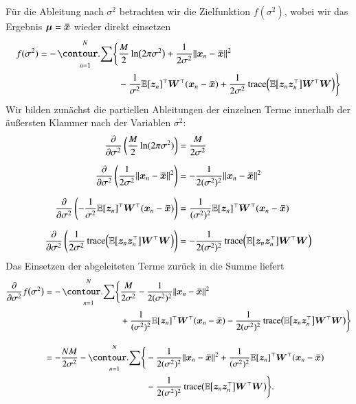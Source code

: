 Für die Ableitung nach $\sigma^2$ betrachten wir die Zielfunktion $f(\sigma^2)$, wobei wir das Ergebnis $\bm{\mu} = \bm{\bar{x}}$ wieder direkt einsetzen
\begin{equation*}
    	\begin{aligned}
        		f(\sigma^2) = -\sum_{n=1}^N \Biggl\{ 
            		&\frac{M}{2} \ln\bigl( 2 \pi \sigma^2 \bigr) + \frac{1}{2 \sigma^2} \Vert \bx_n - \bxmean \Vert^2
		\\
            		&- \frac{1}{\sigma^2} \E[\bz_n]^\top \bW^\top (\bx_n - \bxmean) + \frac{1}{2 \sigma^2} \trace\Bigl( \E\bigl[ \bz_n \bz_n^\top \bigr] 				\bW^\top \bW \Bigr) 
        		\Biggr\}
    \end{aligned}
\end{equation*}
Wir bilden zunächst die partiellen Ableitungen der einzelnen Terme innerhalb der äußersten Klammer nach der Variablen $\sigma^2$:
\begin{align*}
	\frac{\partial}{\partial \sigma^2} \left( \frac{M}{2} \ln(2 \pi \sigma^2) \right) 
        		&= \frac{M}{2 \sigma^2}
\\[2mm]
	\frac{\partial}{\partial \sigma^2} \left( \frac{1}{2 \sigma^2} \Vert \bm{x}_n - \bm{\bar{x}} \Vert^2 \right) 
        		&= -\frac{1}{2 (\sigma^2)^2} \Vert \bm{x}_n - \bm{\bar{x}} \Vert^2
\\[2mm]
	\frac{\partial}{\partial \sigma^2} \left( -\frac{1}{\sigma^2} \mathbb{E}[\bm{z}_n]^\top \bm{W}^\top (\bm{x}_n - \bm{\bar{x}}) \right) 
        		&= \frac{1}{(\sigma^2)^2} \mathbb{E}[\bm{z}_n]^\top \bm{W}^\top (\bm{x}_n - \bm{\bar{x}})
\\[2mm]
	\frac{\partial}{\partial \sigma^2} \left( \frac{1}{2 \sigma^2} \operatorname{\text{trace}}\Bigl( \mathbb{E}\bigl[ \bm{z}_n \bm{z}_n^\top \bigr] \bm{W}^\top \bm{W} \Bigr) \right) 
		&= -\frac{1}{2 (\sigma^2)^2} \operatorname{\text{trace}}\Bigl( \mathbb{E}\bigl[ \bm{z}_n \bm{z}_n^\top \bigr] \bm{W}^\top \bm{W} \Bigr)
\end{align*}
Das Einsetzen der abgeleiteten Terme zurück in die Summe liefert
\begin{align*}
	\frac{\partial}{\partial \sigma^2} f\bigl( \sigma^2 \bigr)
		&= \begin{aligned}[t]
            		-\sum_{n=1}^N \Biggl\{ 
                			&\frac{M}{2 \sigma^2} - \frac{1}{2 (\sigma^2)^2} \Vert \bx_n - \bxmean \Vert^2
		\\
                			&+ \frac{1}{(\sigma^2)^2} \E[\bz_n]^\top \bW^\top (\bx_n - \bxmean)
					- \frac{1}{2 (\sigma^2)^2} \trace\bigl( \E\bigl[ \bz_n \bz_n^\top \bigr] \bW^\top \bW \bigr) 
            		\Biggr\} 
        		\end{aligned}
\\[3mm]
		&= \begin{aligned}[t]
            		-\frac{N M}{2 \sigma^2} - \sum_{n=1}^N \Biggl\{ 
                			&-\frac{1}{2 (\sigma^2)^2} \Vert \bx_n - \bxmean \Vert^2 + \frac{1}{(\sigma^2)^2} \E[\bz_n]^\top \bW^\top (\bx_n - \bxmean)
		\\
                			&- \frac{1}{2 (\sigma^2)^2} \trace\bigl( \E\bigl[ \bz_n \bz_n^\top \bigr] \bW^\top \bW \bigr) 
            		\Biggr\}.
        \end{aligned}
\end{align*}
